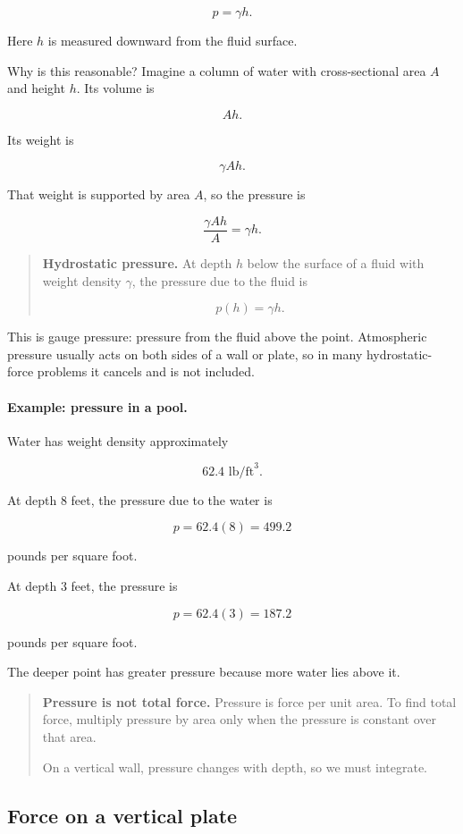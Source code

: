 \[
\boxed{
p=\gamma h.
}
\]

Here \(h\) is measured downward from the fluid surface.

Why is this reasonable?  Imagine a column of water with cross-sectional area \(A\) and
height \(h\).  Its volume is

\[
Ah.
\]

Its weight is

\[
\gamma Ah.
\]

That weight is supported by area \(A\), so the pressure is

\[
\frac{\gamma Ah}{A}=\gamma h.
\]

\begin{quote}
\textbf{Hydrostatic pressure.}
At depth \(h\) below the surface of a fluid with weight density \(\gamma\), the pressure
due to the fluid is

\[
\boxed{
p(h)=\gamma h.
}
\]
\end{quote}

This is gauge pressure: pressure from the fluid above the point.  Atmospheric pressure
usually acts on both sides of a wall or plate, so in many hydrostatic-force problems it
cancels and is not included.

\paragraph{Example: pressure in a pool.}
Water has weight density approximately

\[
62.4\text{ lb/ft}^3.
\]

At depth \(8\) feet, the pressure due to the water is

\[
p=62.4(8)=499.2
\]

pounds per square foot.

At depth \(3\) feet, the pressure is

\[
p=62.4(3)=187.2
\]

pounds per square foot.

The deeper point has greater pressure because more water lies above it.

\begin{quote}
\textbf{Pressure is not total force.}
Pressure is force per unit area.  To find total force, multiply pressure by area only when
the pressure is constant over that area.

On a vertical wall, pressure changes with depth, so we must integrate.
\end{quote}

\subsection{Force on a vertical plate}
\label{subsec:force-vertical-plate}

